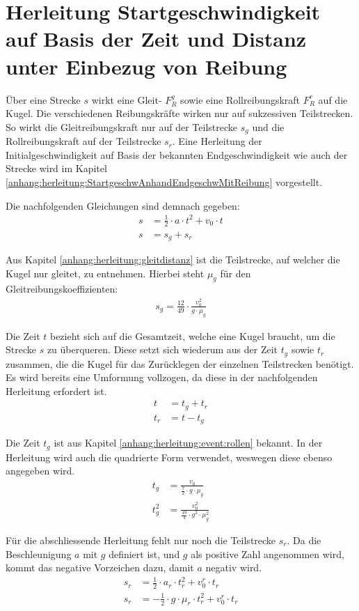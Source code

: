 \section{Herleitung Startgeschwindigkeit auf Basis der Zeit und Distanz unter Einbezug von Reibung}\label{anhang:herleitung:initialVelocityWithTime}
Über eine Strecke $s$ wirkt eine Gleit- $F^g_R$ sowie eine Rollreibungskraft $F^r_R$ auf die Kugel.
Die verschiedenen Reibungskräfte wirken nur auf sukzessiven Teilstrecken.
So wirkt die Gleitreibungskraft nur auf der Teilstrecke $s_g$ und die Rollreibungskraft auf der Teilstrecke $s_r$.
Eine Herleitung der Initialgeschwindigkeit auf Basis der bekannten Endgeschwindigkeit wie
auch der Strecke wird im Kapitel \ref{anhang:herleitung:StartgeschwAnhandEndgeschwMitReibung} vorgestellt.

Die nachfolgenden Gleichungen sind demnach gegeben:
\begin{align}
    s &= \frac{1}{2} \cdot a \cdot t^2 + v_0 \cdot t\\
    s &= s_g + s_r
\end{align}

Aus Kapitel \ref{anhang:herleitung:gleitdistanz} ist die Teilstrecke, auf welcher die Kugel nur gleitet, zu entnehmen.
Hierbei steht $\mu_g$ für den Gleitreibungskoeffizienten:
\begin{align}
    s_g = \frac{12}{49} \cdot \frac{v_0^2}{g \cdot \mu_g}
\end{align}

Die Zeit $t$ bezieht sich auf die Gesamtzeit, welche eine Kugel braucht, um die Strecke $s$ zu überqueren.
Diese setzt sich wiederum aus der Zeit $t_g$ sowie $t_r$ zusammen, die die Kugel für das Zurücklegen der einzelnen
Teilstrecken benötigt. Es wird bereits eine Umformung vollzogen, da diese in der nachfolgenden Herleitung erfordert ist.
\begin{align}
    t &= t_g + t_r\\
    t_r &= t - t_g
\end{align}

Die Zeit $t_g$ ist aus Kapitel \ref{anhang:herleitung:event:rollen} bekannt. In der Herleitung wird auch die quadrierte
Form verwendet, weswegen diese ebenso angegeben wird.
\begin{align}
    t_g &= \frac{v_0}{\frac{7}{2} \cdot g \cdot \mu_g}\\
    t_g^2 &= \frac{v_0^2}{\frac{49}{4} \cdot g^2 \cdot \mu_g^2}
\end{align}

Für die abschliessende Herleitung fehlt nur noch die Teilstrecke $s_r$.
Da die Beschleunigung $a$ mit $g$ definiert ist, und $g$ als positive Zahl angenommen wird,
kommt das negative Vorzeichen dazu, damit $a$ negativ wird.
\begin{align}
    s_r &= \frac{1}{2} \cdot a_r \cdot t_r^2 + v^r_0 \cdot t_r\\
    s_r &= - \frac{1}{2} \cdot g \cdot \mu_r \cdot t_r^2 + v^r_0 \cdot t_r
\end{align}

